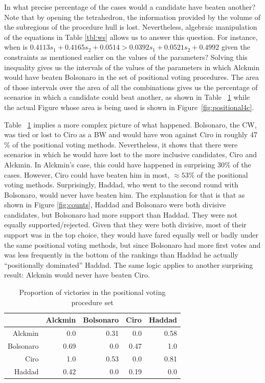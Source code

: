 \documentclass[hidelinks,11pt]{article} \usepackage[utf8]{inputenc}
\begin{document}
In what precise percentage of the cases would a candidate have beaten another? Note that by opening the tetrahedron, the information provided by the volume of the subregions of the procedure hull is lost. Nevertheless, algebraic manipulation of the equations in Table \ref{tbl:ws} allows us to answer this question. For instance, when is \( 0.4113 s_{1} + 0.4165 s_2 + 0.0514 > 0.0392 s_{1} + 0.0521 s_2 + 0.4992 \) given the constraints as mentioned earlier on the values of the parameters? Solving this inequality gives us the intervals of the values of the parameters in which Alckmin would have beaten Bolsonaro in the set of positional voting procedures. The area of those intervals over the area of all the combinations gives us the percentage of scenarios in which a candidate could beat another, as shown in Table ~\ref{tbl:ctn} while the actual Figure whose area is being used is shown in Figure~\ref{fig:positional4c}.

Table ~\ref{tbl:ctn} implies a more complex picture of what happened. Bolsonaro, the CW, was tied or lost to Ciro as a BW and would have won against Ciro in roughly 47\(\%\) of the positional voting methods. Nevertheless, it shows that there were scenarios in which he would have lost to the more inclusive candidates, Ciro and Alckmin. In Alckmin's case, this could have happened in surprising \(30\%\) of the cases. However, Ciro could have beaten him in most, \(\approx 53\%\) of the positional voting methods. Surprisingly, Haddad, who went to the second round with Bolsonaro, would never have beaten him. The explanation for that is that as shown in Figure \ref{fig:counts}, Haddad and Bolsonaro were both divisive candidates, but Bolsonaro had more support than Haddad. They were not equally supported/rejected. Given that they were both divisive, most of their support was in the top choice, they would have fared equally well or badly under the same positional voting methods, but since Bolsonaro had more first votes and was less frequently in the bottom of the rankings than Haddad he actually ``positionally dominated'' Haddad. The same logic applies to another surprising result: Alckmin would never have beaten Ciro.


\begin{table}[!h]
  \centering
  \begin{tabular}{rrrrr}
    \hline
     & Alckmin & Bolsonaro & Ciro & Haddad \\
    \hline
    Alckmin & 0.0 & 0.31 & 0.0 & 0.58 \\
    Bolsonaro & 0.69 & 0.0 & 0.47 & 1.0 \\
    Ciro & 1.0 & 0.53 & 0.0 & 0.81 \\
    Haddad & 0.42 & 0.0 & 0.19 & 0.0 \\\hline\hline
  \end{tabular}
   \caption{Proportion of victories in the positional voting procedure set}
\label{tbl:ctn}
\end{table}
\end{document}
